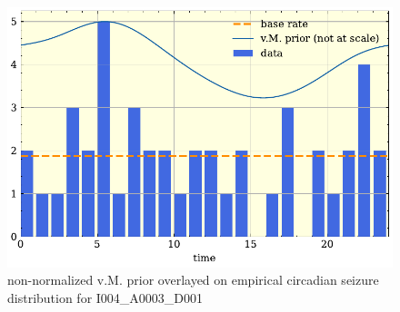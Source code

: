 \begin{figure}[h]
    \centering
    \includegraphics{5Results/figs/prior/vm_prior.pdf}
    \caption{non-normalized v.M. prior overlayed on empirical circadian seizure distribution for I004\_A0003\_D001}
    \label{fig:vm_prior}
\end{figure}

\protect {}
